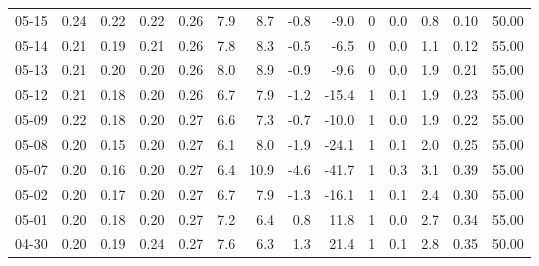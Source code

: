 \begin{threeparttable}
{\begin{tabular}{lrrrrrrrrrrrrr}
  05-15 &          0.24 &          0.22 &          0.22 &        0.26 &                 7.9 &                 8.7 &       -0.8 &         -9.0 &              0 &                 0.0 &              0.8 &            0.10 &                  50.00 \\
  05-14 &          0.21 &          0.19 &          0.21 &        0.26 &                 7.8 &                 8.3 &       -0.5 &         -6.5 &              0 &                 0.0 &              1.1 &            0.12 &                  55.00 \\
  05-13 &          0.21 &          0.20 &          0.20 &        0.26 &                 8.0 &                 8.9 &       -0.9 &         -9.6 &              0 &                 0.0 &              1.9 &            0.21 &                  55.00 \\
  05-12 &          0.21 &          0.18 &          0.20 &        0.26 &                 6.7 &                 7.9 &       -1.2 &        -15.4 &              1 &                 0.1 &              1.9 &            0.23 &                  55.00 \\
  05-09 &          0.22 &          0.18 &          0.20 &        0.27 &                 6.6 &                 7.3 &       -0.7 &        -10.0 &              1 &                 0.0 &              1.9 &            0.22 &                  55.00 \\
  05-08 &          0.20 &          0.15 &          0.20 &        0.27 &                 6.1 &                 8.0 &       -1.9 &        -24.1 &              1 &                 0.1 &              2.0 &            0.25 &                  55.00 \\
  05-07 &          0.20 &          0.16 &          0.20 &        0.27 &                 6.4 &                10.9 &       -4.6 &        -41.7 &              1 &                 0.3 &              3.1 &            0.39 &                  55.00 \\
  05-02 &          0.20 &          0.17 &          0.20 &        0.27 &                 6.7 &                 7.9 &       -1.3 &        -16.1 &              1 &                 0.1 &              2.4 &            0.30 &                  55.00 \\
  05-01 &          0.20 &          0.18 &          0.20 &        0.27 &                 7.2 &                 6.4 &        0.8 &         11.8 &              1 &                 0.0 &              2.7 &            0.34 &                  55.00 \\
  04-30 &          0.20 &          0.19 &          0.24 &        0.27 &                 7.6 &                 6.3 &        1.3 &         21.4 &              1 &                 0.1 &              2.8 &            0.35 &                  50.00 \\

\end{tabular}}
\end{threeparttable}
